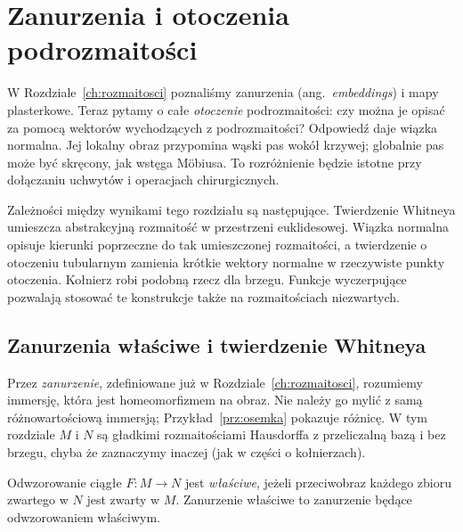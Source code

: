 \chapter{Zanurzenia i otoczenia podrozmaitości}
\label{ch:wlozenia-otoczenia}

\providecommand{\atlasref}[2]{#2}

W Rozdziale~\ref{ch:rozmaitosci} poznaliśmy zanurzenia
(ang.\ \emph{embeddings}) i mapy plasterkowe.
Teraz pytamy o całe \emph{otoczenie} podrozmaitości:
czy można je opisać za pomocą wektorów wychodzących
z podrozmaitości? Odpowiedź daje wiązka normalna.
Jej lokalny obraz przypomina wąski pas wokół krzywej;
globalnie pas może być skręcony, jak wstęga Möbiusa.
To rozróżnienie będzie istotne przy dołączaniu uchwytów
i operacjach chirurgicznych.

Zależności między wynikami tego rozdziału są następujące.
Twierdzenie Whitneya umieszcza abstrakcyjną rozmaitość
w przestrzeni euklidesowej. Wiązka normalna opisuje
kierunki poprzeczne do tak umieszczonej rozmaitości,
a twierdzenie o otoczeniu tubularnym zamienia krótkie
wektory normalne w rzeczywiste punkty otoczenia.
Kołnierz robi podobną rzecz dla brzegu. Funkcje
wyczerpujące pozwalają stosować te konstrukcje także
na rozmaitościach niezwartych.

\section{Zanurzenia właściwe i twierdzenie Whitneya}
\label{sec:whitney-wlozenia}

Przez \emph{zanurzenie}, zdefiniowane już
w Rozdziale~\ref{ch:rozmaitosci}, rozumiemy immersję,
która jest homeomorfizmem na obraz. Nie należy go
mylić z samą różnowartościową immersją;
Przykład~\ref{prz:osemka} pokazuje różnicę.
W tym rozdziale $M$ i $N$ są gładkimi rozmaitościami
Hausdorffa z przeliczalną bazą i bez brzegu, chyba że
zaznaczymy inaczej (jak w części o kołnierzach).

\begin{definicja}
\label{def:odwzorowanie-wlasciwe}
Odwzorowanie ciągłe $F:M\to N$ jest \emph{właściwe},
jeżeli przeciwobraz każdego zbioru zwartego w $N$
jest zwarty w $M$. Zanurzenie właściwe to zanurzenie
będące odwzorowaniem właściwym.
\end{definicja}

